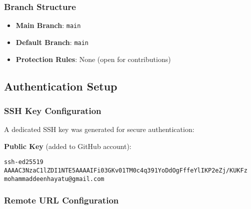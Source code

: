 \documentclass[
  11pt,
]{article}
\newenvironment{Shaded}{\begin{snugshade}}{\end{snugshade}}
\newcommand{\AttributeTok}[1]{\textcolor[rgb]{0.13,0.29,0.53}{#1}}
\newcommand{\BuiltInTok}[1]{#1}
\newcommand{\CommentTok}[1]{\textcolor[rgb]{0.56,0.35,0.01}{\textit{#1}}}
\newcommand{\FunctionTok}[1]{\textcolor[rgb]{0.13,0.29,0.53}{\textbf{#1}}}
\newcommand{\NormalTok}[1]{#1}
\newcommand{\StringTok}[1]{\textcolor[rgb]{0.31,0.60,0.02}{#1}}
\newcommand{\VariableTok}[1]{\textcolor[rgb]{0.00,0.00,0.00}{#1}}
\providecommand{\tightlist}{%
  \setlength{\itemsep}{0pt}\setlength{\parskip}{0pt}}
\begin{document}
\subsubsection{Branch Structure}\label{branch-structure}

\begin{itemize}
\tightlist
\item
  \textbf{Main Branch}: \texttt{main}
\item
  \textbf{Default Branch}: \texttt{main}
\item
  \textbf{Protection Rules}: None (open for contributions)
\end{itemize}

\subsection{Authentication Setup}\label{authentication-setup}

\subsubsection{SSH Key Configuration}\label{ssh-key-configuration}

A dedicated SSH key was generated for secure authentication:

\begin{Shaded}
\end{Shaded}

\textbf{Public Key} (added to GitHub account):

\begin{verbatim}
ssh-ed25519 AAAAC3NzaC1lZDI1NTE5AAAAIFi03GKv01TM0c4q391YoDdOgFffeYlIKP2eZj/KUKFz mohammaddeenhayatu@gmail.com
\end{verbatim}

\subsubsection{Remote URL Configuration}\label{remote-url-configuration}
\end{document}
